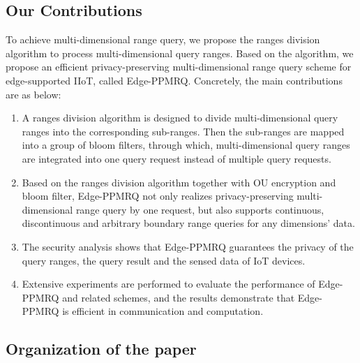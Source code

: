 \documentclass[IEEE JOURNAL OF BIOMEDICAL AND HEALTH INFORMATICS]{IEEEtran}
\begin{document}
\subsection{Our Contributions}
To achieve multi-dimensional range query, we propose the ranges division algorithm to process multi-dimensional query ranges. Based on the algorithm, we propose an efficient privacy-preserving multi-dimensional range query scheme for edge-supported IIoT, called Edge-PPMRQ. Concretely, the main contributions are as below:

	\begin{enumerate}
		\item A ranges division algorithm is designed to divide multi-dimensional query ranges into the corresponding sub-ranges. Then the sub-ranges are mapped into a group of bloom filters, through which, multi-dimensional query ranges are integrated into one query request instead of multiple query requests.
		\item Based on the ranges division algorithm together with OU encryption and bloom filter, Edge-PPMRQ not only realizes privacy-preserving multi-dimensional range query by one request, but also supports continuous, discontinuous and arbitrary boundary range queries for any dimensions' data. 
		\item The security analysis shows that Edge-PPMRQ guarantees the privacy of the query ranges, the query result and the sensed data of IoT devices. 
		\item Extensive experiments are performed to evaluate the performance of Edge-PPMRQ and related schemes, and the results demonstrate that Edge-PPMRQ is efficient in communication and computation.	
	\end{enumerate}


\subsection{Organization of the paper}
{\color{black}{The remaining parts of this paper are arranged as follows. In section II, the preliminary knowledge is introduced. Section III describes our system model, security model and the design goals. The proposed privacy-preserving multi-dimensional range query scheme for edge-supported IIoT and the corresponding security analysis are described in section IV and V, respectively. Section VI evaluates the communication and computation performance of Edge-PPMRQ by comparing with other related schemes. Finally, section VIII concludes the full paper.}}
\end{document}
